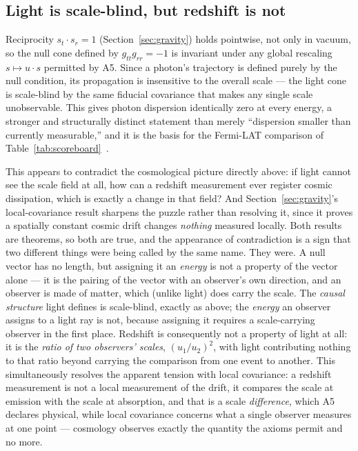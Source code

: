 \documentclass[pdflatex,sn-mathphys-num]{sn-jnl}
\theoremstyle{thmstyleone}
\theoremstyle{thmstylethree}
\theoremstyle{thmstyletwo}
\begin{document}
\subsection{Light is scale-blind, but redshift is not}

Reciprocity $s_t\cdot s_r=1$ (Section~\ref{sec:gravity}) holds pointwise,
not only in vacuum, so the null cone defined by $g_{tt}g_{rr}=-1$ is
invariant under any global rescaling $s\mapsto u\cdot s$ permitted by A5.
Since a photon's trajectory is defined purely by the null condition, its
propagation is insensitive to the overall scale — the light cone is
scale-blind by the same fiducial covariance that makes any single scale
unobservable. This gives photon dispersion identically zero at every
energy, a stronger and structurally distinct statement than merely
``dispersion smaller than currently measurable,'' and it is the basis for
the Fermi-LAT comparison of Table~\ref{tab:scoreboard}~\cite{FermiLAT2009}.

This appears to contradict the cosmological picture directly above: if
light cannot see the scale field at all, how can a redshift measurement
ever register cosmic dissipation, which is exactly a change in that
field? And Section~\ref{sec:gravity}'s local-covariance result sharpens
the puzzle rather than resolving it, since it proves a spatially
constant cosmic drift changes \emph{nothing} measured locally. Both
results are theorems, so both are true, and the appearance of
contradiction is a sign that two different things were being called by
the same name. They were. A null vector has no length, but assigning it
an \emph{energy} is not a property of the vector alone — it is the
pairing of the vector with an observer's own direction, and an observer
is made of matter, which (unlike light) does carry the scale. The
\emph{causal structure} light defines is scale-blind, exactly as above;
the \emph{energy} an observer assigns to a light ray is not, because
assigning it requires a scale-carrying observer in the first place.
Redshift is consequently not a property of light at all: it is the
\emph{ratio of two observers' scales}, $(u_1/u_2)^2$, with light
contributing nothing to that ratio beyond carrying the comparison from
one event to another. This simultaneously resolves the apparent tension
with local covariance: a redshift measurement is not a local measurement
of the drift, it compares the scale at emission with the scale at
absorption, and that is a scale \emph{difference}, which A5 declares
physical, while local covariance concerns what a single observer measures
at one point — cosmology observes exactly the quantity the axioms permit
and no more.
\end{document}
